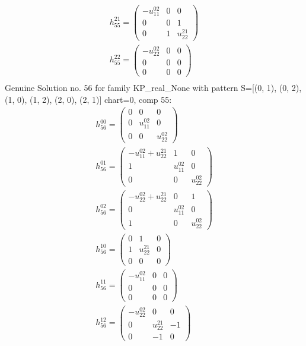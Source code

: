 \documentclass[a4paper, 11pt, twoside, onecolumn]{article}
\begin{document}
\begin{landscape}
\begin{gather*}
	 h_{55}^{21}=\begin{pmatrix}- u^{02}_{11} & 0 & 0\\0 & 0 & 1\\0 & 1 & u^{21}_{22}\end{pmatrix}\\ 
	 h_{55}^{22}=\begin{pmatrix}- u^{02}_{22} & 0 & 0\\0 & 0 & 0\\0 & 0 & 0\end{pmatrix}\\ 
\end{gather*} 
Genuine Solution no. 56 for family KP_real_None with pattern S=[(0, 1), (0, 2), (1, 0), (1, 2), (2, 0), (2, 1)] chart=0, comp 55: 
\begin{gather*} 
	 h_{56}^{00}=\begin{pmatrix}0 & 0 & 0\\0 & u^{02}_{11} & 0\\0 & 0 & u^{02}_{22}\end{pmatrix}\\ 
	 h_{56}^{01}=\begin{pmatrix}- u^{02}_{11} + u^{21}_{22} & 1 & 0\\1 & u^{02}_{11} & 0\\0 & 0 & u^{02}_{22}\end{pmatrix}\\ 
	 h_{56}^{02}=\begin{pmatrix}- u^{02}_{22} + u^{21}_{22} & 0 & 1\\0 & u^{02}_{11} & 0\\1 & 0 & u^{02}_{22}\end{pmatrix}\\ 
	 h_{56}^{10}=\begin{pmatrix}0 & 1 & 0\\1 & u^{21}_{22} & 0\\0 & 0 & 0\end{pmatrix}\\ 
	 h_{56}^{11}=\begin{pmatrix}- u^{02}_{11} & 0 & 0\\0 & 0 & 0\\0 & 0 & 0\end{pmatrix}\\ 
	 h_{56}^{12}=\begin{pmatrix}- u^{02}_{22} & 0 & 0\\0 & u^{21}_{22} & -1\\0 & -1 & 0\end{pmatrix}\\ 

\end{gather*}
\end{landscape}
\end{document}
